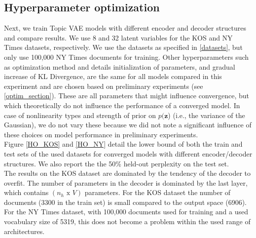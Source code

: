 \documentclass{report}
\begin{document}
	\subsection{Hyperparameter optimization}\label{HO_section}
	Next, we train Topic VAE models with different encoder and decoder structures and compare results. We use 8 and 32 latent variables for the KOS and NY Times datasets, respectively. We use the datasets as specified in \ref{datasets}, but only use 100,000 NY Times documents for training. Other hyperparameters such as optimization method and details initialization of parameters, and gradual increase of KL Divergence, are the same for all models compared in this experiment and are chosen based on preliminary experiments (see \ref{optim_section}). These are all parameters that might influence convergence, but which theoretically do not influence the performance of a converged model. In case of nonlinearity types and strength of prior on $p(\mathbf{z}$) (i.e., the variance of the Gaussian), we do not vary these because we did not note a significant influence of these choices on model performance in preliminary experiments. \\
	Figure \ref{HO_KOS} and \ref{HO_NY} detail the lower bound of both the train and test sets of the used datasets for converged models with different encoder/decoder structures. We also report the the 50\% held-out perplexity on the test set.\\
	The results on the KOS dataset are dominated by the tendency of the decoder to overfit. The number of parameters in the decoder is dominated by the last layer, which contains $(n_h \text{ x } V)$ parameters. For the KOS dataset the number of documents (3300 in the train set) is small compared to the output space (6906). For the NY Times dataset, with 100,000 documents used for training and a used vocabulary size of 5319, this does not become a problem within the used range of architectures.  
		
\end{document}
